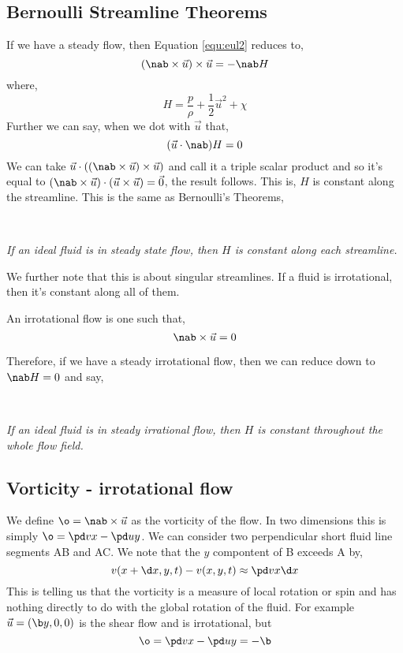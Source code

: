 \subsection{Bernoulli Streamline Theorems}
If we have a steady flow, then Equation \ref{equ:eul2} reduces to,
\begin{equation}
  (\nab \times \vec u) \times \vec u = - \nab H \label{equ:bern1}
\end{equation}
where,
$$ H = \frac{p}{\rho} + \frac{1}{2}\vec u^2 + \chi $$
Further we can say, when we dot with $\vec u$ that,
$$ (\vec u \cdot \nab)H = 0 $$
We can take $\vec u \cdot ((\nab \times \vec u) \times \vec u)$ and call it a triple scalar product and so it's equal to $(\nab \times \vec u) \cdot (\vec u \times \vec u) = \vec 0$, the result follows. This is, $H$ is constant along the streamline. This is the same as Bernoulli's Theorems,
\begin{nthm}~
  \begin{center}
    \textit{If an ideal fluid is in steady state flow, then $H$ is constant along each streamline.}
  \end{center}
\end{nthm}
\noindent
We further note that this is about singular streamlines. If a fluid is irrotational, then it's constant along all of them.
\begin{ndefi}
  An irrotational flow is one such that,
  $$ \nab \times \vec u = 0 $$
\end{ndefi}

\noindent
Therefore, if we have a steady irrotational flow, then we can reduce  down to $\nab H = 0$ and say,
\begin{nthm}~
  \begin{center}
    \textit{If an ideal fluid is in steady irrational flow, then $H$ is constant throughout the whole flow field.}
  \end{center}
\end{nthm}

\subsection{Vorticity - irrotational flow}
We define $\o = \nab \times \vec u$ as the vorticity of the flow. In two dimensions this is simply $\o = \pd v x - \pd u y$. We can consider two perpendicular short fluid line segments AB and AC. We note that the $y$ compontent of B exceeds A by,
$$ v(x + \d x, y, t) - v(x, y, t) \approx \pd v x \d x $$
This is telling us that the vorticity is a measure of local rotation or spin and has nothing directly to do with the global rotation of the fluid. For example $\vec u = (\b y, 0, 0)$ is the shear flow and is irrotational, but
$$ \o = \pd v x - \pd u y = - \b $$

